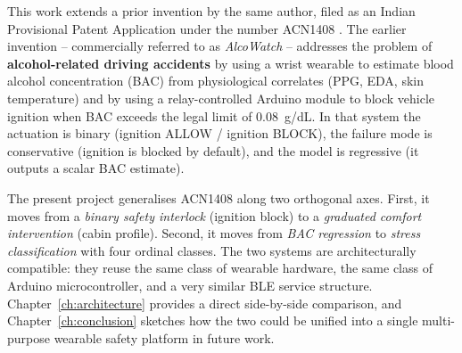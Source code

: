 This work extends a prior invention by the same author, filed as an
Indian Provisional Patent Application under the number ACN1408
\citep{acn1408}. The earlier invention -- commercially referred to
as \emph{AlcoWatch} -- addresses the problem of \textbf{alcohol-related
driving accidents} by using a wrist wearable to estimate blood alcohol
concentration (BAC) from physiological correlates (PPG, EDA, skin
temperature) and by using a relay-controlled Arduino module to block
vehicle ignition when BAC exceeds the legal limit of 0.08~g/dL. In
that system the actuation is binary (ignition ALLOW / ignition BLOCK),
the failure mode is conservative (ignition is blocked by default),
and the model is regressive (it outputs a scalar BAC estimate).

The present project generalises ACN1408 along two orthogonal axes.
First, it moves from a \emph{binary safety interlock} (ignition block)
to a \emph{graduated comfort intervention} (cabin profile). Second,
it moves from \emph{BAC regression} to \emph{stress classification}
with four ordinal classes. The two systems are architecturally
compatible: they reuse the same class of wearable hardware, the same
class of Arduino microcontroller, and a very similar BLE service
structure. Chapter~\ref{ch:architecture} provides a direct side-by-side
comparison, and Chapter~\ref{ch:conclusion} sketches how the two could
be unified into a single multi-purpose wearable safety platform
in future work.
